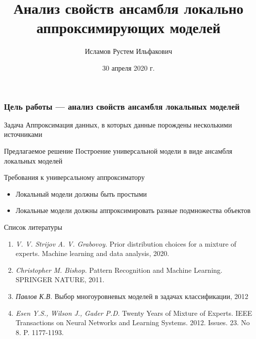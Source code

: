 \documentclass[9pt,pdf,hyperref={unicode}]{beamer}
\title[Ансамбль локальных моделей]
{Анализ свойств ансамбля локально
аппроксимирующих моделей}
\author[Исламов Р.\ И.]{\Large Исламов Рустем Ильфакович}
\institute[]{\large Московский физико-технический институт\\
~\\

Консультант: Грабовой А.\ В.\\
Эксперт:   Стрижов В.\ В.
}
\date{30 апреля 2020 г.}
\begin{document}
\begin{frame}
\titlepage
\end{frame}



\begin{frame}
\frametitle{Цель работы --- анализ свойств ансамбля локальных моделей} 


\begin{block}{Задача}
Аппроксимация данных, в которых данные порождены несколькими источниками
\end{block}


\begin{block}{Предлагаемое решение}
Построение универсальной модели в виде ансамбля локальных
моделей
\end{block}

\begin{block}{Требования к универсальному аппроксиматору}
\begin{itemize}
    \item Локальный модели должны быть простыми
    \item Локальные модели должны аппроксимировать разные подмножества объектов
    
\end{itemize}
\end{block}

\end{frame}

\begin{frame}{Список литературы}
	\begin{enumerate}
	\justifying
		\item \textit{V. V. Strijov A. V. Grabovoy.} Prior distribution choices for a mixture of experts. Machine learning and data analysis, 2020.
		

		\item \textit{Christopher M. Bishop.} Pattern Recognition and Machine Learning. SPRINGER NATURE, 2011.
 
		
		\item \textit{Павлов К.В.}  Выбор многоуровневых моделей в задачах классификации, 2012
		
		\item \textit{Esen Y.S., Wilson J., Gader P.D.}  Twenty Years of Mixture of Experts. IEEE Transactions on Neural Networks and Learning Systems. 2012. Issues. 23. No 8. P. 1177-1193.
		
	\end{enumerate}
\end{frame}
\end{document}
